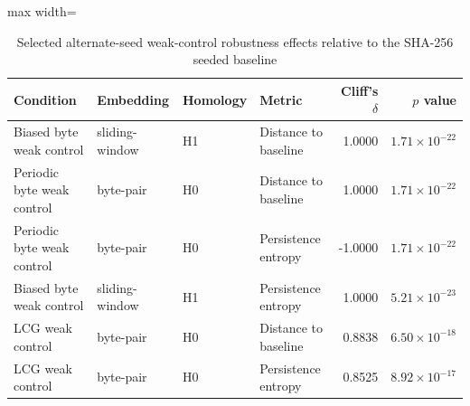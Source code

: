 
\begin{table}[htbp]
\centering
\caption{Selected alternate-seed weak-control robustness effects relative to the SHA-256 seeded baseline}
\label{tab:seed-robustness-effects}
\begin{adjustbox}{max width=\textwidth}
\begin{tabular}{llllrr}
\toprule
Condition & Embedding & Homology & Metric & Cliff's $\delta$ & $p$ value \\
\midrule
Biased byte weak control & sliding-window & H1 & Distance to baseline & 1.0000 & $1.71 \times 10^{-22}$ \\
Periodic byte weak control & byte-pair & H0 & Distance to baseline & 1.0000 & $1.71 \times 10^{-22}$ \\
Periodic byte weak control & byte-pair & H0 & Persistence entropy & -1.0000 & $1.71 \times 10^{-22}$ \\
Biased byte weak control & sliding-window & H1 & Persistence entropy & 1.0000 & $5.21 \times 10^{-23}$ \\
LCG weak control & byte-pair & H0 & Distance to baseline & 0.8838 & $6.50 \times 10^{-18}$ \\
LCG weak control & byte-pair & H0 & Persistence entropy & 0.8525 & $8.92 \times 10^{-17}$ \\
\bottomrule
\end{tabular}
\end{adjustbox}
\end{table}
